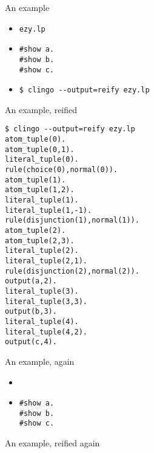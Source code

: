 \begin{frame}[fragile]{An example}
  \begin{itemize}
  \item {} \texttt{ezy.lp}
    
  \item<2-> 
\begin{lstlisting}
#show a.
#show b.
#show c.
\end{lstlisting}
  \item<3-> 
\begin{lstlisting}
$ clingo --output=reify ezy.lp
\end{lstlisting}
  \end{itemize}
\end{frame}
\begin{frame}[fragile,shrink=28]{An example, reified}
\bigskip
\begin{lstlisting}
$ clingo --output=reify ezy.lp
atom_tuple(0).
atom_tuple(0,1).
literal_tuple(0).
rule(choice(0),normal(0)).
atom_tuple(1).
atom_tuple(1,2).
literal_tuple(1).
literal_tuple(1,-1).
rule(disjunction(1),normal(1)).
atom_tuple(2).
atom_tuple(2,3).
literal_tuple(2).
literal_tuple(2,1).
rule(disjunction(2),normal(2)).
output(a,2).
literal_tuple(3).
literal_tuple(3,3).
output(b,3).
literal_tuple(4).
literal_tuple(4,2).
output(c,4).
\end{lstlisting}
\end{frame}
\begin{frame}[fragile]{An example, again}
  \bigskip
  \begin{itemize}
  \item []
    
  \item []
    \begin{lstlisting}
#show a.
#show b.
#show c.
    \end{lstlisting}
  \end{itemize}
\end{frame}
\begin{frame}[fragile,shrink=28]{An example, reified again}
  \bigskip
  
\end{frame}
%
